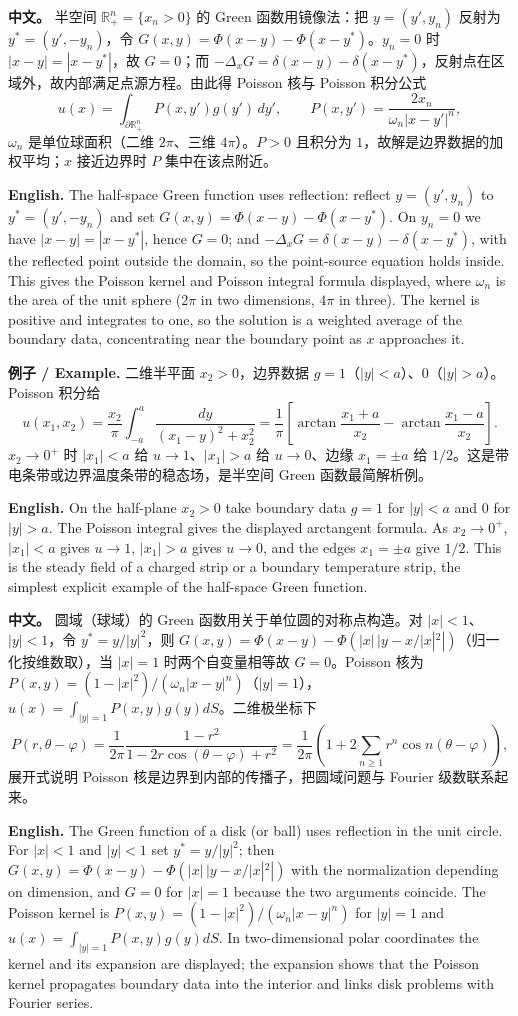 \documentclass[UTF8,11pt,a4paper]{ctexart}
\newcommand{\EN}[1]{\par\noindent \textbf{English.} #1\par}
\newcommand{\EX}[2]{\par\noindent \textbf{例子 / Example.} #1\par\EN{#2}}
\newcommand{\APS}[2]{\par\noindent\textbf{中文。} #1\par\noindent\textbf{English.} #2\par\smallskip}
\begin{document}
\APS{半空间 $\mathbb R^n_+=\{x_n>0\}$ 的 Green 函数用镜像法：把 $y=(y',y_n)$ 反射为 $y^*=(y',-y_n)$，令 $G(x,y)=\Phi(x-y)-\Phi(x-y^*)$。$y_n=0$ 时 $|x-y|=|x-y^*|$，故 $G=0$；而 $-\Delta_xG=\delta(x-y)-\delta(x-y^*)$，反射点在区域外，故内部满足点源方程。由此得 Poisson 核与 Poisson 积分公式
\[
u(x)=\int_{\partial\mathbb R^n_+}P(x,y')g(y')\,dy',\qquad
P(x,y')=\frac{2x_n}{\omega_n|x-y'|^n},
\]
$\omega_n$ 是单位球面积（二维 $2\pi$、三维 $4\pi$）。$P>0$ 且积分为 $1$，故解是边界数据的加权平均；$x$ 接近边界时 $P$ 集中在该点附近。}{The half-space Green function uses reflection: reflect $y=(y',y_n)$ to $y^*=(y',-y_n)$ and set $G(x,y)=\Phi(x-y)-\Phi(x-y^*)$. On $y_n=0$ we have $|x-y|=|x-y^*|$, hence $G=0$; and $-\Delta_xG=\delta(x-y)-\delta(x-y^*)$, with the reflected point outside the domain, so the point-source equation holds inside. This gives the Poisson kernel and Poisson integral formula displayed, where $\omega_n$ is the area of the unit sphere ($2\pi$ in two dimensions, $4\pi$ in three). The kernel is positive and integrates to one, so the solution is a weighted average of the boundary data, concentrating near the boundary point as $x$ approaches it.}
\EX{二维半平面 $x_2>0$，边界数据 $g=1$（$|y|<a$）、$0$（$|y|>a$）。Poisson 积分给
\[
u(x_1,x_2)=\frac{x_2}{\pi}\int_{-a}^{a}\frac{dy}{(x_1-y)^2+x_2^2}
=\frac1\pi\left[\arctan\frac{x_1+a}{x_2}-\arctan\frac{x_1-a}{x_2}\right].
\]
$x_2\to0^+$ 时 $|x_1|<a$ 给 $u\to1$、$|x_1|>a$ 给 $u\to0$、边缘 $x_1=\pm a$ 给 $1/2$。这是带电条带或边界温度条带的稳态场，是半空间 Green 函数最简解析例。}{On the half-plane $x_2>0$ take boundary data $g=1$ for $|y|<a$ and $0$ for $|y|>a$. The Poisson integral gives the displayed arctangent formula. As $x_2\to0^+$, $|x_1|<a$ gives $u\to1$, $|x_1|>a$ gives $u\to0$, and the edges $x_1=\pm a$ give $1/2$. This is the steady field of a charged strip or a boundary temperature strip, the simplest explicit example of the half-space Green function.}
\APS{圆域（球域）的 Green 函数用关于单位圆的对称点构造。对 $|x|<1$、$|y|<1$，令 $y^*=y/|y|^2$，则 $G(x,y)=\Phi(x-y)-\Phi(|x|\,|y-x/|x|^2|)$（归一化按维数取），当 $|x|=1$ 时两个自变量相等故 $G=0$。Poisson 核为 $P(x,y)=(1-|x|^2)/(\omega_n|x-y|^n)$（$|y|=1$），$u(x)=\int_{|y|=1}P(x,y)g(y)dS$。二维极坐标下
\[
P(r,\theta-\varphi)=\frac{1}{2\pi}\frac{1-r^2}{1-2r\cos(\theta-\varphi)+r^2}
=\frac1{2\pi}\left(1+2\sum_{n\ge1}r^n\cos n(\theta-\varphi)\right),
\]
展开式说明 Poisson 核是边界到内部的传播子，把圆域问题与 Fourier 级数联系起来。}{The Green function of a disk (or ball) uses reflection in the unit circle. For $|x|<1$ and $|y|<1$ set $y^*=y/|y|^2$; then $G(x,y)=\Phi(x-y)-\Phi(|x|\,|y-x/|x|^2|)$ with the normalization depending on dimension, and $G=0$ for $|x|=1$ because the two arguments coincide. The Poisson kernel is $P(x,y)=(1-|x|^2)/(\omega_n|x-y|^n)$ for $|y|=1$ and $u(x)=\int_{|y|=1}P(x,y)g(y)dS$. In two-dimensional polar coordinates the kernel and its expansion are displayed; the expansion shows that the Poisson kernel propagates boundary data into the interior and links disk problems with Fourier series.}
\end{document}
